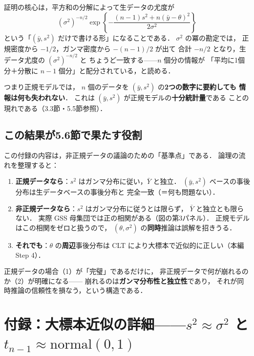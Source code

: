\documentclass[lualatex,ja=standard,a4paper,12pt]{bxjsarticle}
\begin{document}
\begin{pointbox}
証明の核心は，平方和の分解によって生データの尤度が
\[
  (\sigma^2)^{-n/2}
  \exp\!\left\{-\frac{(n-1)s^2 + n(\bar{y}-\theta)^2}{2\sigma^2}\right\}
\]
という「$(\bar{y}, s^2)$ だけで書ける形」になることである．
$\sigma^2$ の冪の勘定では，
正規密度から $-1/2$，ガンマ密度から $-(n-1)/2$ が出て
合計 $-n/2$ となり，生データ尤度の $(\sigma^2)^{-n/2}$ と
ちょうど一致する——$n$ 個分の情報が
「平均に1個分＋分散に $n-1$ 個分」と配分されている，と読める．
\end{pointbox}

\medskip
つまり正規モデルでは，
$n$ 個のデータを $(\bar{y}, s^2)$ の\textbf{2つの数字に要約しても
情報は何も失われない}．
これは $(\bar{y}, s^2)$ が正規モデルの\textbf{十分統計量}である
ことの現れである（3.3節・5.5節参照）．

\subsection{この結果が5.6節で果たす役割}

この付録の内容は，非正規データの議論のための「基準点」である．
論理の流れを整理すると：

\begin{enumerate}
  \item \textbf{正規データなら}：$s^2$ はガンマ分布に従い，$\bar{Y}$ と独立．
        $(\bar{y}, s^2)$ ベースの事後分布は生データベースの事後分布と
        完全一致（＝何も問題ない）．
  \item \textbf{非正規データなら}：$s^2$ はガンマ分布に従うとは限らず，
        $\bar{Y}$ と独立とも限らない．
        実際 GSS 母集団では正の相関がある（図の第3パネル）．
        正規モデルはこの相関をゼロと扱うので，
        $(\theta, \sigma^2)$ の\textbf{同時}推論は誤解を招きうる．
  \item \textbf{それでも}：$\theta$ の\textbf{周辺}事後分布は
        CLT により大標本で近似的に正しい（本編 Step 4）．
\end{enumerate}

正規データの場合（1）が「完璧」であるだけに，
非正規データで何が崩れるのか（2）が明確になる——
崩れるのは\textbf{ガンマ分布性と独立性}であり，
それが同時推論の信頼性を損なう，という構造である．

\section{付録：大標本近似の詳細——$s^2 \approx \sigma^2$ と
$t_{n-1} \approx \mathrm{normal}(0,1)$}
\end{document}
